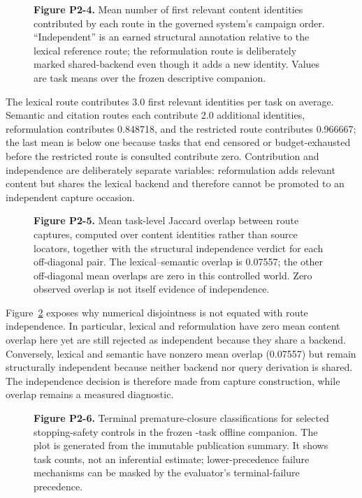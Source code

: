 \begin{figure}[t]
\centering

\caption{\textbf{Figure P2-4.} Mean number of first relevant content identities
contributed by each route in the governed system's campaign order.  ``Independent'' is an
earned structural annotation relative to the lexical reference route; the
reformulation route is deliberately marked shared-backend even though it adds a
new identity.  Values are task means over the frozen descriptive companion.}
\label{fig:p2-4}
\end{figure}

The lexical route contributes 3.0 first relevant identities per task on
average.  Semantic and citation routes each contribute 2.0 additional identities,
reformulation contributes 0.848718, and the restricted route contributes 0.966667;
the last mean is below one because tasks that end censored or budget-exhausted
before the restricted route is consulted contribute zero.  Contribution and
independence are deliberately separate variables: reformulation adds relevant
content but shares the lexical backend and therefore cannot be promoted to an
independent capture occasion.

\begin{figure}[t]
\centering

\caption{\textbf{Figure P2-5.} Mean task-level Jaccard overlap between route
captures, computed over content identities rather than source locators, together
with the structural independence verdict for each off-diagonal pair.  The
lexical--semantic overlap is 0.07557; the other off-diagonal mean overlaps are
zero in this controlled world.  Zero observed overlap is not itself evidence of
independence.}
\label{fig:p2-5}
\end{figure}

Figure~\ref{fig:p2-5} exposes why numerical disjointness is not equated with
route independence.  In particular, lexical and reformulation have zero
mean content overlap here yet are still rejected as independent because they
share a backend.  Conversely, lexical and semantic have nonzero mean overlap
(0.07557) but remain structurally independent because neither backend nor query
derivation is shared.  The independence decision is therefore made from capture
construction, while overlap remains a measured diagnostic.

\begin{figure}[t]
\centering

\caption{\textbf{Figure P2-6.} Terminal premature-closure classifications for
selected stopping-safety controls in the frozen \OfflineTaskCount{}-task offline companion.  The
plot is generated from the immutable publication summary.  It shows task counts,
not an inferential estimate; lower-precedence failure mechanisms can be masked by
the evaluator's terminal-failure precedence.}
\label{fig:p2-6}
\end{figure}

